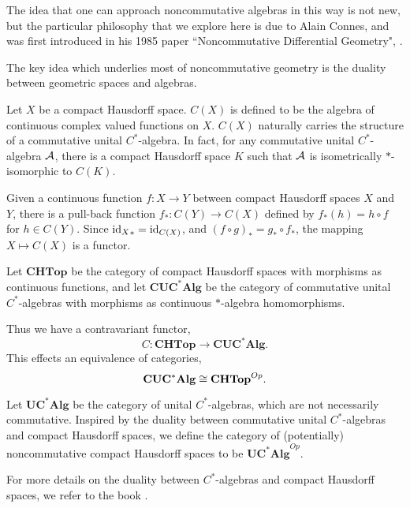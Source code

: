 The idea that one can approach noncommutative algebras in this way
is not new, but the particular philosophy that we explore here is due
to Alain Connes, and was first introduced in his 1985 paper ``Noncommutative
Differential Geometry", \cite{connes1985non}. 

The key idea which underlies most of noncommutative geometry is the duality
between geometric spaces and algebras. 

\begin{example}
    Let $X$ be a compact Hausdorff space. $C(X)$ is defined to be the algebra
    of continuous complex valued functions on $X$. $C(X)$ naturally carries
    the structure of a commutative unital $C^*$-algebra. In fact, for any commutative
    unital $C^*$-algebra $\mathcal{A}$, there is a compact Hausdorff space $K$
    such that $\mathcal{A}$ is isometrically $*$-isomorphic to $C(K)$.
    
    Given a continuous function $f:X\rightarrow Y$ between compact Hausdorff spaces
    $X$ and $Y$, there is a pull-back function $f_*:C(Y)\rightarrow C(X)$ defined
    by $f_*(h) = h\circ f$ for $h \in C(Y)$. Since ${\operatorname{id}_X}_* = \operatorname{id}_{C(X)}$, 
    and $(f\circ g)_* = g_* \circ f_*$, the mapping $X\mapsto C(X)$
    is a functor. 
    
    Let $\mathbf{CHTop}$ be the category of compact Hausdorff spaces
    with morphisms as continuous functions, and let $\mathbf{CUC^*Alg}$
    be the category of commutative unital $C^*$-algebras with morphisms
    as continuous $*$-algebra homomorphisms.
    
    Thus we have a contravariant functor,
    \begin{equation}
        C:\mathbf{CHTop}\rightarrow \mathbf{CUC^*Alg}.
    \end{equation}
    This effects an equivalence of categories,
    \begin{equation}
        \mathbf{CUC^*Alg} \cong \mathbf{CHTop}^{Op}.
    \end{equation}
    
    Let $\mathbf{UC^*Alg}$ be the category of unital $C^*$-algebras,
    which are not necessarily commutative. Inspired by the duality between commutative
    unital $C^*$-algebras and compact Hausdorff spaces, we define
    the category of (potentially) noncommutative compact Hausdorff spaces
    to be $\mathbf{UC^*Alg}^{Op}$.
\end{example}
For more details on the duality between $C^*$-algebras
and compact Hausdorff spaces, we refer to the book \cite{Sakai1971}.

